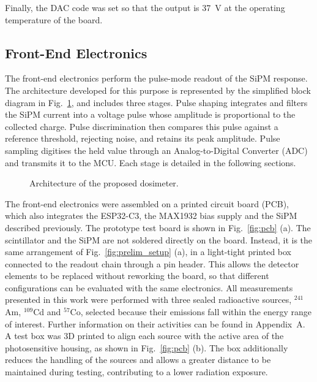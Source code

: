 Finally, the DAC code was set so that the output is 37~V at the operating temperature of the board.


\subsection{Front-End Electronics}
\label{sec:front_end}
The front-end electronics perform the pulse-mode readout of the SiPM response. The architecture developed for this purpose is represented by the simplified block diagram in Fig.~\ref{fig:architecture}, and includes three stages. Pulse shaping integrates and filters the SiPM current into a voltage pulse whose amplitude is proportional to the collected charge. Pulse discrimination then compares this pulse against a reference threshold, rejecting noise, and retains its peak amplitude. Pulse sampling digitises the held value through an Analog-to-Digital Converter (ADC) and transmits it to the MCU. Each stage is detailed in the following sections.
\begin{figure}[H]
  \centering
  \resizebox{\linewidth}{!}{}
  \caption[Architecture of the proposed dosimeter.]{Architecture of the proposed dosimeter.}
  \label{fig:architecture}
\end{figure}

The front-end electronics were assembled on a printed circuit board (PCB), which also integrates the ESP32-C3, the MAX1932 bias supply and the SiPM described previously. The prototype test board is shown in Fig.~\ref{fig:pcb} (a). The scintillator and the SiPM are not soldered directly on the board. Instead, it is the same arrangement of Fig.~\ref{fig:prelim_setup} (a), in a light-tight printed box connected to the readout chain through a pin header. This allows the detector elements to be replaced without reworking the board, so that different configurations can be evaluated with the same electronics. All measurements presented in this work were performed with three sealed radioactive sources, $^{241}$Am, $^{109}$Cd and $^{57}$Co, selected because their emissions fall within the energy range of interest. Further information on their activities can be found in Appendix~A. A test box was 3D printed to align each source with the active area of the photosensitive housing, as shown in Fig.~\ref{fig:pcb} (b). The box additionally reduces the handling of the sources and allows a greater distance to be maintained during testing, contributing to a lower radiation exposure.

